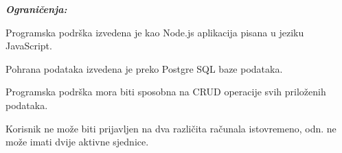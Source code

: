 			 
	    	\textbf{\textit{Ograničenja:}}\\
		 
			\begin{packed_item}
	
						\item Programska podrška izvedena je kao Node.js aplikacija pisana u jeziku JavaScript.
						\item  Pohrana podataka izvedena je preko Postgre SQL baze podataka.
						\item Programska podrška mora biti sposobna na CRUD operacije svih priloženih podataka.
						\item  Korisnik ne može biti prijavljen na dva različita računala istovremeno, odn. ne može imati dvije aktivne sjednice.
						
					\end{packed_item}
			 
			 
			 
	